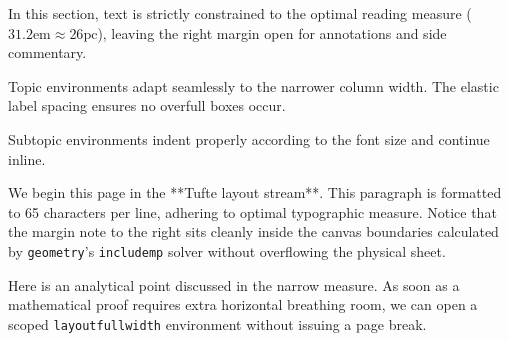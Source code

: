 \documentclass[paper=a4, fontsize=9]{habshe-tufte}
\begin{document}
\newpage
\setlayouttufte

\subject{Part II: Pure Tufte Stream}





In this section, text is strictly constrained to the optimal reading measure ($31.2\text{em} \approx 26\text{pc}$), leaving the right margin open for annotations and side commentary.

\lipsum[4]

\begin{topic}
  Topic environments adapt seamlessly to the narrower column width. The elastic label spacing ensures no overfull boxes occur.

  \lipsum[7]

  \begin{subtopic}
    Subtopic environments indent properly according to the font size and continue inline.

    \lipsum[9]
  \end{subtopic}
\end{topic}

\lipsum[5]

\newpage
\subject{Part III: Mid-Page Layout Dynamics}


We begin this page in the **Tufte layout stream**. This paragraph is formatted to 65 characters per line, adhering to optimal typographic measure. 
Notice that the margin note to the right sits cleanly inside the canvas boundaries calculated by \texttt{geometry}'s \texttt{includemp} solver without overflowing the physical sheet.

\begin{topic}
  Here is an analytical point discussed in the narrow measure. As soon as a mathematical proof requires extra horizontal breathing room, we can open a scoped \texttt{layoutfullwidth} environment without issuing a page break.
\end{topic}
\end{document}
